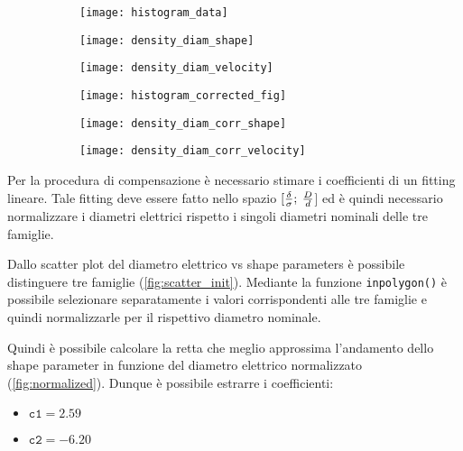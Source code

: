 \begin{figure*}[h!]
	\centering
	\begin{subfigure}{0.33\linewidth}
		\centering
		\texttt{[image: histogram\_data]}
		\caption{}
	\end{subfigure}\hfill
	\begin{subfigure}{0.33\linewidth}
		\centering
		\texttt{[image: density\_diam\_shape]}
		\caption{}
	\end{subfigure}\hfill
	\begin{subfigure}{0.33\linewidth}
		\centering
		\texttt{[image: density\_diam\_velocity]}
		\caption{}
	\end{subfigure}\hfill
	\begin{subfigure}{0.33\linewidth}
		\centering
		\texttt{[image: histogram\_corrected\_fig]}
		\caption{}
	\end{subfigure}\hfill
	\begin{subfigure}{0.33\linewidth}
		\centering
		\texttt{[image: density\_diam\_corr\_shape]}
		\caption{}
	\end{subfigure}\hfill
	\begin{subfigure}{0.33\linewidth}
		\centering
		\texttt{[image: density\_diam\_corr\_velocity]}
		\caption{}
	\end{subfigure}
	\caption{}
	\label{fig:density}
\end{figure*}


Per la procedura di compensazione è necessario stimare i coefficienti di un fitting lineare. Tale fitting deve essere fatto nello spazio $[{\delta\over \sigma};\:{D\over d}$] ed è quindi necessario normalizzare i diametri elettrici rispetto i singoli diametri nominali delle tre famiglie. 

Dallo scatter plot del diametro elettrico vs shape parameters è possibile distinguere tre famiglie (\cref{fig:scatter_init}). Mediante la funzione \texttt{inpolygon()} è possibile selezionare separatamente i valori corrispondenti alle tre famiglie e quindi normalizzarle per il rispettivo diametro nominale. 

Quindi è possibile calcolare la retta che meglio approssima l'andamento dello shape parameter in funzione del diametro elettrico normalizzato (\cref{fig:normalized}). Dunque è possibile estrarre i coefficienti:
\begin{itemize}
	\item $\mathtt{c1}=2.59$
	\item $\mathtt{c2}=-6.20$
\end{itemize}

